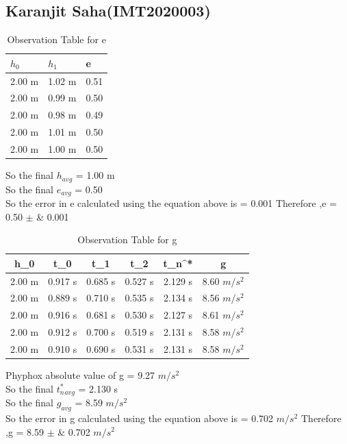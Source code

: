 \documentclass[11pt]{scrartcl} %
\begin{document}
\subsection{Karanjit Saha(IMT2020003)}

\begin{table}[h] %
	\centering %
	\begin{tabular}{l l l}
		\toprule
		\textbf{$h_0$} & \textbf{$h_1$} & \textbf{e} \\
		\midrule
		2.00 m & 1.02 m & 0.51\\
		2.00 m & 0.99 m  & 0.50\\
		2.00 m & 0.98 m  & 0.49\\
		2.00 m & 1.01 m & 0.50 \\
		2.00 m & 1.00 m & 0.50 \\
		\bottomrule
	\end{tabular}
	\caption{Observation Table for e}
\end{table}
So the final $h_{avg}$ = 1.00 m\\
So the final $e_{avg}$ = 0.50\\
So the error in e calculated using the equation above is  = 0.001 \newline
Therefore ,e = 0.50  $\pm$ &  0.001 \\

\begin{table}[h]
\centering
\begin{tabular}{||c c c c c c||} 
\toprule
 \hline
 h_0 & t_0 & t_1 & t_2 & t_n^* & g \\ [0.5ex] 
 \midrule
 \hline\hline
 2.00 m & 0.917 s & 0.685 s  & 0.527 s & 2.129 s & 8.60 $m/s^2$  \\ 
 \hline
 2.00 m & 0.889 s & 0.710 s & 0.535 s & 2.134 s & 8.56 $m/s^2$  \\
 \hline
 2.00 m & 0.916 s & 0.681 s & 0.530 s & 2.127 s  & 8.61 $m/s^2$   \\
 \hline
 2.00 m & 0.912 s & 0.700 s & 0.519 s & 2.131 s  & 8.58 $m/s^2$   \\
 \hline
 2.00 m & 0.910 s & 0.690 s & 0.531 s & 2.131 s  & 8.58 $m/s^2$  \\ [1ex] 
 \bottomrule
 \hline
\end{tabular}
\caption{Observation Table for g}
\end{table}
Phyphox absolute value of g = 9.27 $m/s^2$\\
So the final $t_n^*_{avg}$ = 2.130 s\\
So the final $g_{avg}$ = 8.59 $m/s^2$\\
So the error in g calculated using the equation above is  = 0.702 $m/s^2$ \newline
Therefore ,g = 8.59  $\pm$ &  0.702 $m/s^2$ \\
\end{document}
